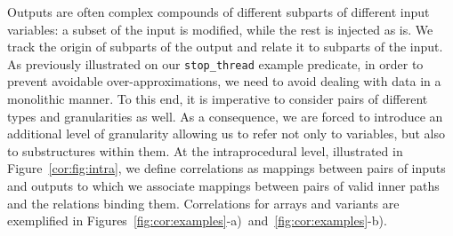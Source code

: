 \documentclass[11pt]{article}
\newcommand{\disp}[1]{\lstinline&#1&}
\begin{document}
Outputs are often complex compounds of different subparts of different
input variables: a subset of the input is modified, while the rest is
injected as is.  We track the origin of subparts of the output and
relate it to subparts of the input. As previously illustrated on our
\disp{stop_thread} example predicate, in order to prevent avoidable
over-approximations, we need to avoid dealing with data in a
monolithic manner. To this end, it is imperative to consider pairs of
different types and granularities as well. As a consequence, we are
forced to introduce an additional level of granularity allowing us to
refer not only to variables, but also to substructures within them. At
the intraprocedural level, illustrated in Figure~\ref{cor:fig:intra},
we define correlations as mappings between pairs of inputs and outputs
to which we associate mappings between pairs of valid inner paths and
the relations binding them. Correlations for arrays and variants are
exemplified in 
Figures~\ref{fig:cor:examples}-a)~and~\ref{fig:cor:examples}-b).
\end{document}
